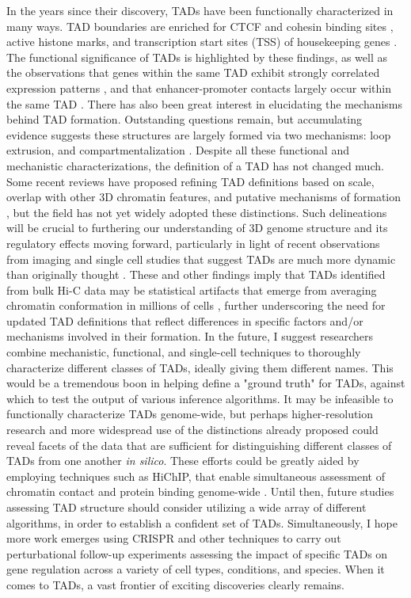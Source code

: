 In the years since their discovery, TADs have been functionally characterized in many ways. TAD boundaries are enriched for CTCF and cohesin binding sites \cite{Dixon.2012, Rao.2014, Bortle.2014}, active histone marks, and transcription start sites (TSS) of housekeeping genes \cite{Szabo.2019, Hou.2012, Ramirez.2018}. The functional significance of TADs is highlighted by these findings, as well as the observations that genes within the same TAD exhibit strongly correlated expression patterns \cite{Nora.2012, Ramirez.2018, Symmons.2014}, and that enhancer-promoter contacts largely occur within the same TAD \cite{Bonev.2017, Symmons.2016, Smith.2016, Delaneau.2019}. There has also been great interest in elucidating the mechanisms behind TAD formation. Outstanding questions remain, but accumulating evidence suggests these structures are largely formed via two mechanisms: loop extrusion, and compartmentalization \cite{Nuebler.2018, Fudenberg.2016, Sanborn.2015, Rowley.2017, Eagen.2017}. Despite all these functional and mechanistic characterizations, the definition of a TAD has not changed much. Some recent reviews have proposed refining TAD definitions based on scale, overlap with other 3D chromatin features, and putative mechanisms of formation \cite{Dixon.2016, Beagan.2020}, but the field has not yet widely adopted these distinctions. Such delineations will be crucial to furthering our understanding of 3D genome structure and its regulatory effects moving forward, particularly in light of recent observations from imaging and single cell studies that suggest TADs are much more dynamic than originally thought \cite{Gizzi.2020, Finn.2019}. These and other findings imply that TADs identified from bulk Hi-C data may be statistical artifacts that emerge from averaging chromatin conformation in millions of cells \cite{Wit.2019)}, further underscoring the need for updated TAD definitions that reflect differences in specific factors and/or mechanisms involved in their formation. In the future, I suggest researchers combine mechanistic, functional, and single-cell techniques to thoroughly characterize different classes of TADs, ideally giving them different names. This would be a tremendous boon in helping define a "ground truth" for TADs, against which to test the output of various inference algorithms. It may be infeasible to functionally characterize TADs genome-wide, but perhaps higher-resolution research and more widespread use of the distinctions already proposed could reveal facets of the data that are sufficient for distinguishing different classes of TADs from one another \textit{in silico}. These efforts could be greatly aided by employing techniques such as HiChIP, that enable simultaneous assessment of chromatin contact and protein binding genome-wide \cite{Mumbach.2016}. Until then, future studies assessing TAD structure should consider utilizing a wide array of different algorithms, in order to establish a confident set of TADs. Simultaneously, I hope more work emerges using CRISPR and other techniques to carry out perturbational follow-up experiments assessing the impact of specific TADs on gene regulation across a variety of cell types, conditions, and species. When it comes to TADs, a vast frontier of exciting discoveries clearly remains.

